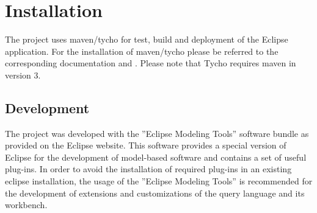 \section{Installation}\label{chapter:installation}
The project uses maven/tycho for test, build and deployment of the Eclipse 
application. For the installation of maven/tycho please be referred to the 
corresponding documentation \cite{tycho} and \cite{maven}. Please note that 
Tycho requires maven in version 3.

\subsection{Development}
The project was developed with the ''Eclipse Modeling Tools'' software bundle as
provided on the Eclipse website. This software provides a special version of 
Eclipse for the development of model-based software and contains a set of useful
plug-ins. In order to avoid the installation of required plug-ins in an existing
eclipse installation, the usage of the ''Eclipse Modeling Tools'' is recommended
for the development of extensions and customizations of the query language and
its workbench.

